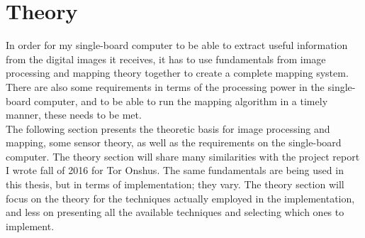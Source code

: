 \section{Theory}
In order for my single-board computer to be able to extract useful information from the digital images it receives, it has to use fundamentals from image processing and mapping theory together to create a complete mapping system. There are also some requirements in terms of the processing power in the single-board computer, and to be able to run the mapping algorithm in a timely manner, these needs to be met. \\

The following section presents the theoretic basis for image processing and mapping, some sensor theory, as well as the requirements on the single-board computer. The theory section will share many similarities with the project report\cite{kris} I wrote fall of 2016 for Tor Onshus. The same fundamentals are being used in this thesis, but in terms of implementation; they vary. The theory section will focus on the theory for the techniques actually employed in the implementation, and less on presenting all the available techniques and selecting which ones to implement.



\newpage

\newpage


